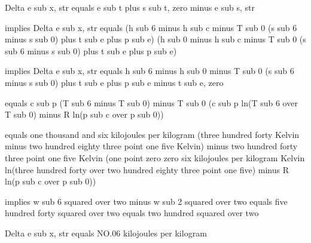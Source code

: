 Delta e sub x, str equals e sub t plus s sub t, zero minus e sub s, str

implies Delta e sub x, str equals (h sub 6 minus h sub c minus T sub 0 (s sub 6 minus s sub 0) plus t sub e plus p sub e) (h sub 0 minus h sub c minus T sub 0 (s sub 6 minus s sub 0) plus t sub e plus p sub e)

implies Delta e sub x, str equals h sub 6 minus h sub 0 minus T sub 0 (s sub 6 minus s sub 0) plus t sub e plus p sub e minus t sub e, zero

equals c sub p (T sub 6 minus T sub 0) minus T sub 0 (c sub p ln(T sub 6 over T sub 0) minus R ln(p sub c over p sub 0))

equals one thousand and six kilojoules per kilogram (three hundred forty Kelvin minus two hundred eighty three point one five Kelvin) minus two hundred forty three point one five Kelvin (one point zero zero six kilojoules per kilogram Kelvin ln(three hundred forty over two hundred eighty three point one five) minus R ln(p sub c over p sub 0))

implies w sub 6 squared over two minus w sub 2 squared over two equals five hundred forty squared over two equals two hundred squared over two

Delta e sub x, str equals NO.06 kilojoules per kilogram